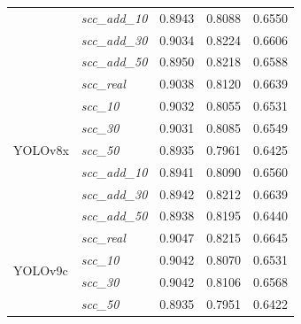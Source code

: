 \begin{table}[h!]
{\begin{tabular}{l|l|c|c|c}
                                      & \textit{scc\_add\_10}   & 0.8943                    & 0.8088                     & 0.6550                    \\
                                      & \textit{scc\_add\_30}   & 0.9034                    & 0.8224                     & 0.6606                    \\
                                      & \textit{scc\_add\_50}   & 0.8950                    & 0.8218                     & 0.6588                    \\
        \midrule
        \multirow[t]{7}{*}{YOLOv8x}   & \textit{scc\_real} & \cellcolor{blue!10}0.9038  & \cellcolor{blue!10}0.8120 & \cellcolor{blue!10}0.6639     \\
                                      & \textit{scc\_10}   & 0.9032                     & 0.8055                    & 0.6531                    \\
                                      & \textit{scc\_30}   & 0.9031                     & 0.8085                    & 0.6549                    \\
                                      & \textit{scc\_50}   & 0.8935                     & 0.7961                    & 0.6425                    \\
                                      & \textit{scc\_add\_10}   & 0.8941                    & 0.8090                     & 0.6560                    \\
                                      & \textit{scc\_add\_30}   & 0.8942                    & 0.8212                     & 0.6639                    \\
                                      & \textit{scc\_add\_50}   & 0.8938                    & 0.8195                     & 0.6440                    \\
        \midrule
        \multirow[t]{7}{*}{YOLOv9c}   & \textit{scc\_real} & \cellcolor{blue!10}0.9047  & \cellcolor{blue!10}0.8215 & \cellcolor{blue!10}0.6645     \\
                                      & \textit{scc\_10}   & 0.9042                     & 0.8070                    & 0.6531                    \\
                                      & \textit{scc\_30}   & 0.9042                     & 0.8106                    & 0.6568                    \\
                                      & \textit{scc\_50}   & 0.8935                     & 0.7951                    & 0.6422                    \\

\end{tabular}}
\end{table}
